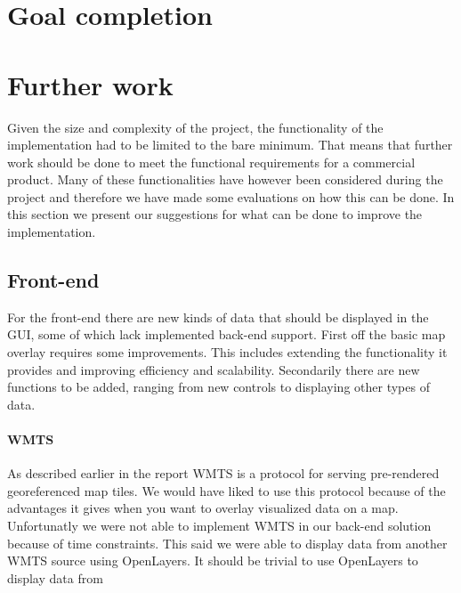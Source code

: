 \documentclass[11pt,a4paper,titlepage,oneside]{report}
\begin{document}
\section{Goal completion}
\section{Further work}
Given the size and complexity of the project, the functionality of the implementation had to be limited to the bare minimum. That means that further work should be done to meet the functional requirements for a commercial product. Many of these functionalities have however been considered during the project and therefore we have made some evaluations on how this can be done. In this section we present our suggestions for what can be done to improve the implementation.

\subsection{Front-end}
For the front-end there are new kinds of data that should be displayed in the \gls{GUI}, some of which lack implemented \gls{back-end} support. First off the basic map overlay requires some improvements. This includes extending the functionality it provides and improving efficiency and scalability. Secondarily there are new functions to be added, ranging from new controls to displaying other types of data.
\paragraph{WMTS}
As described earlier in the report \gls{WMTS} is a protocol for serving pre-rendered georeferenced map tiles. We would have liked to use this protocol because of the advantages it gives when you want to overlay visualized data on a map. Unfortunatly we were not able to implement WMTS in our back-end solution because of time constraints. This said we were able to display data from another \gls{WMTS} source using OpenLayers. It should be trivial to use OpenLayers to display data from  
\end{document}
